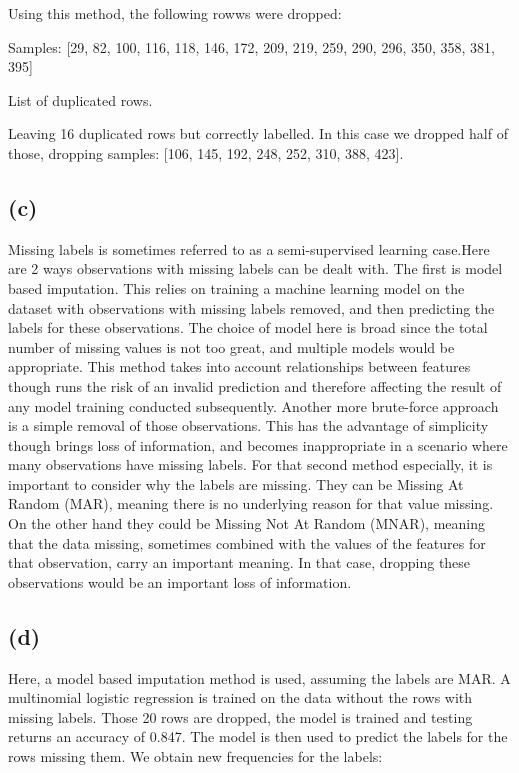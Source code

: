 \documentclass[12pt]{report} %
\begin{document}
Using this method, the following rowws were dropped:

\begin{table}[h]
    \centering
    Samples: [29, 82, 100, 116, 118, 146, 172, 209, 219, 259, 290, 296, 350, 358, 381, 395]
    \caption{List of duplicated rows.}
\end{table}

Leaving 16 duplicated rows but correctly labelled. In this case we dropped half of those, dropping samples: [106, 145, 192, 248, 252, 310, 388, 423]. 

\subsection*{(c)}

Missing labels is sometimes referred to as a semi-supervised learning case\cite[p. 24]{james2013introduction}.Here are 2 ways observations with missing labels can be dealt with. The first is model based imputation. This relies on training a machine learning model on the dataset with observations with missing labels removed, and then predicting the labels for these observations. The choice of model here is broad since the total number of missing values is not too great, and multiple models would be appropriate. This method takes into account relationships between features though runs the risk of an invalid prediction and therefore affecting the result of any model training conducted subsequently. Another more brute-force approach is a simple removal of those observations. This has the advantage of simplicity though brings loss of information, and becomes inappropriate in a scenario where many observations have missing labels. For that second method especially, it is important to consider why the labels are missing. They can be Missing At Random (MAR), meaning there is no underlying reason for that value missing. On the other hand they could be Missing Not At Random (MNAR), meaning that the data missing, sometimes combined with the values of the features for that observation, carry an important meaning. In that case, dropping these observations would be an important loss of information\cite[pp. 515-516]{james2013introduction}.

\subsection*{(d)}

Here, a model based imputation method is used, assuming the labels are MAR. A multinomial logistic regression is trained on the data without the rows with missing labels. Those 20 rows are dropped, the model is trained and testing returns an accuracy of 0.847. The model is then used to predict the labels for the rows missing them. We obtain new frequencies for the labels: 
\end{document}
